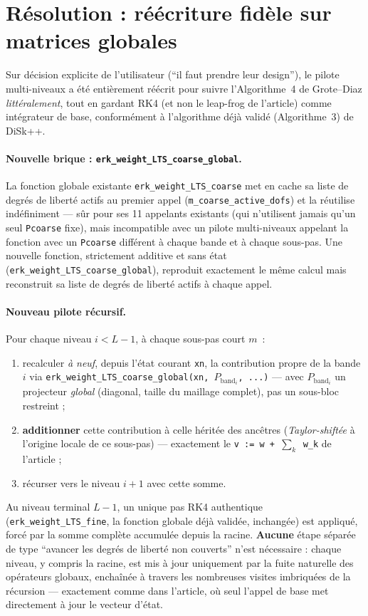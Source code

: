 \documentclass[11pt]{article}
\newcommand{\code}[1]{\texttt{#1}}
\begin{document}
\section{Résolution : réécriture fidèle sur matrices globales}
\label{sec:globalfix}

Sur décision explicite de l'utilisateur (``il faut prendre leur
design''), le pilote multi-niveaux a été entièrement réécrit pour
suivre l'Algorithme~4 de Grote--Diaz \emph{littéralement}, tout en
gardant RK4 (et non le leap-frog de l'article) comme intégrateur de
base, conformément à l'algorithme déjà validé (Algorithme~3) de DiSk++.

\paragraph{Nouvelle brique : \code{erk\_weight\_LTS\_coarse\_global}.}
La fonction globale existante \code{erk\_weight\_LTS\_coarse} met en
cache sa liste de degrés de liberté actifs au premier appel
(\code{m\_coarse\_active\_dofs}) et la réutilise indéfiniment --- sûr
pour ses 11 appelants existants (qui n'utilisent jamais qu'un seul
\code{Pcoarse} fixe), mais incompatible avec un pilote multi-niveaux
appelant la fonction avec un \code{Pcoarse} différent à chaque bande et
à chaque sous-pas. Une nouvelle fonction, strictement additive et sans
état (\code{erk\_weight\_LTS\_coarse\_global}), reproduit exactement le
même calcul mais reconstruit sa liste de degrés de liberté actifs à
chaque appel.

\paragraph{Nouveau pilote récursif.} Pour chaque niveau $i<L-1$, à
chaque sous-pas court $m$~:
\begin{enumerate}
  \item recalculer \emph{à neuf}, depuis l'état courant \code{xn}, la
  contribution propre de la bande $i$ via
  \code{erk\_weight\_LTS\_coarse\_global(xn, $P_{\text{band}_i}$,
  ...)} --- avec $P_{\text{band}_i}$ un projecteur \emph{global}
  (diagonal, taille du maillage complet), pas un sous-bloc restreint ;
  \item \textbf{additionner} cette contribution à celle héritée des
  ancêtres (\emph{Taylor-shiftée} à l'origine locale de ce sous-pas)
  --- exactement le \code{v := w + $\sum_k$ w\_k} de l'article ;
  \item récurser vers le niveau $i+1$ avec cette somme.
\end{enumerate}
Au niveau terminal $L-1$, un unique pas RK4 authentique
(\code{erk\_weight\_LTS\_fine}, la fonction globale déjà validée,
inchangée) est appliqué, forcé par la somme complète accumulée depuis
la racine. \textbf{Aucune} étape séparée de type ``avancer les degrés
de liberté non couverts'' n'est nécessaire : chaque niveau, y compris
la racine, est mis à jour uniquement par la fuite naturelle des
opérateurs globaux, enchaînée à travers les nombreuses visites
imbriquées de la récursion --- exactement comme dans l'article, où seul
l'appel de base met directement à jour le vecteur d'état.
\end{document}
